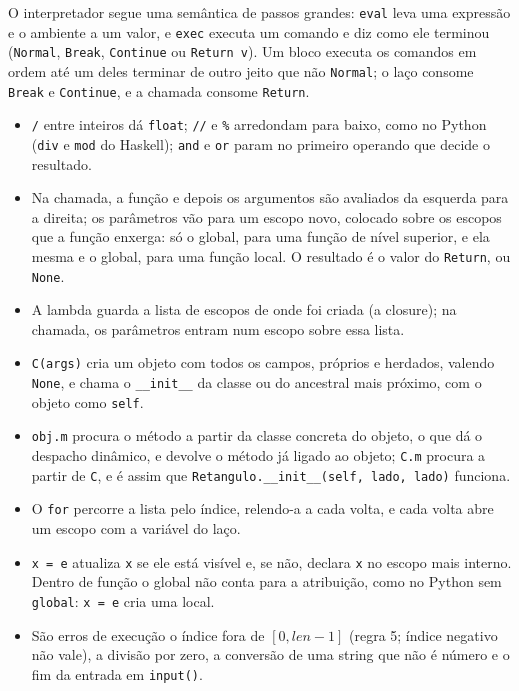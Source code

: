 \documentclass[12pt,a4paper]{article}
\begin{document}
O interpretador segue uma semântica de passos grandes:
\texttt{eval} leva uma expressão e o ambiente a um valor, e
\texttt{exec} executa um comando e diz como ele terminou
(\texttt{Normal}, \texttt{Break}, \texttt{Continue} ou
\texttt{Return v}). Um bloco executa os comandos em ordem até um deles
terminar de outro jeito que não \texttt{Normal}; o laço consome
\texttt{Break} e \texttt{Continue}, e a chamada consome
\texttt{Return}.

\begin{itemize}\setlength{\itemsep}{0pt}
\item \texttt{/} entre inteiros dá \texttt{float}; \texttt{//} e
  \texttt{\%} arredondam para baixo, como no Python (\texttt{div} e
  \texttt{mod} do Haskell); \texttt{and} e \texttt{or} param no
  primeiro operando que decide o resultado.
\item Na chamada, a função e depois os argumentos são avaliados da
  esquerda para a direita; os parâmetros vão para um escopo novo,
  colocado sobre os escopos que a função enxerga: só o global, para
  uma função de nível superior, e ela mesma e o global, para uma
  função local. O resultado é o valor do \texttt{Return}, ou
  \texttt{None}.
\item A lambda guarda a lista de escopos de onde foi criada (a
  closure); na chamada, os parâmetros entram num escopo sobre essa
  lista.
\item \texttt{C(args)} cria um objeto com todos os campos, próprios e
  herdados, valendo \texttt{None}, e chama o \texttt{\_\_init\_\_} da
  classe ou do ancestral mais próximo, com o objeto como
  \texttt{self}.
\item \texttt{obj.m} procura o método a partir da classe concreta do
  objeto, o que dá o despacho dinâmico, e devolve o método já ligado ao
  objeto; \texttt{C.m} procura a partir de \texttt{C}, e é assim que
  \texttt{Retangulo.\_\_init\_\_(self, lado, lado)} funciona.
\item O \texttt{for} percorre a lista pelo índice, relendo-a a cada
  volta, e cada volta abre um escopo com a variável do laço.
\item \texttt{x = e} atualiza \texttt{x} se ele está visível e, se não,
  declara \texttt{x} no escopo mais interno. Dentro de função o global
  não conta para a atribuição, como no Python sem \texttt{global}:
  \texttt{x = e} cria uma local.
\item São erros de execução o índice fora de $[0, \mathit{len}-1]$
  (regra 5; índice negativo não vale), a divisão por zero, a conversão
  de uma string que não é número e o fim da entrada em
  \texttt{input()}.
\end{itemize}
\end{document}

